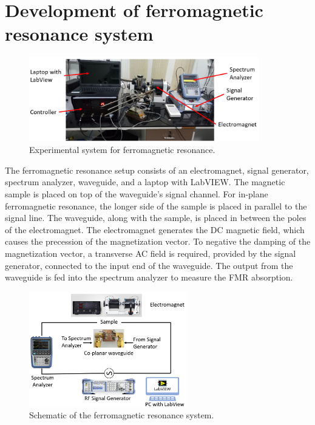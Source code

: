 \documentclass[12pt,a4paper,bold]{thesis}
\theoremstyle{thm}
\theoremstyle{definition}
\begin{document}
\section{Development of ferromagnetic resonance system}
\begin{figure}[H]
	\centering
   \includegraphics[width=10cm]{Images/62.png} 
   \caption{Experimental system for ferromagnetic resonance.}
\end{figure}

\indent\indent\indent The ferromagnetic resonance setup consists of an electromagnet, signal generator, spectrum analyzer, waveguide, and a laptop with LabVIEW.
The magnetic sample is placed on top of the waveguide's signal channel. For in-plane ferromagnetic resonance, the longer side of the sample is placed in parallel to the signal line. The waveguide, along with the sample, is placed in between the poles of the electromagnet. The electromagnet generates the DC magnetic field, which causes the precession of the magnetization vector. To negative the damping of the magnetization vector, a transverse AC field is required, provided by the signal generator, connected to the input end of the waveguide. The output from the waveguide is fed into the spectrum analyzer to measure the FMR absorption. 
\begin{figure}[H]
	\centering
   \includegraphics[height=5cm]{Images/61.png} 
   \caption{Schematic of the ferromagnetic resonance system.}
\end{figure}
\end{document}
